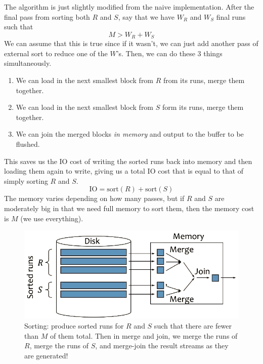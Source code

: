     \begin{algo} 
      The algorithm is just slightly modified from the naive implementation. After the final pass from sorting both $R$ and $S$, say that we have $W_R$ and $W_S$ final runs such that 
      \begin{equation}
        M > W_R + W_S
      \end{equation} 
      We can assume that this is true since if it wasn't, we can just add another pass of external sort to reduce one of the $W$'s. Then, we can do these 3 things simultaneously. 
      \begin{enumerate}
        \item We can load in the next smallest block from $R$ from its runs, merge them together.
        \item We can load in the next smallest block from $S$ form its runs, merge them together. 
        \item We can join the merged blocks \textit{in memory} and output to the buffer to be flushed. 
      \end{enumerate}

      This saves us the IO cost of writing the sorted runs back into memory and then loading them again to write, giving us a total IO cost that is equal to that of simply sorting $R$ and $S$. 
      \begin{equation}
        \mathrm{IO} = \mathrm{sort}(R) + \mathrm{sort}(S)
      \end{equation} 
      The memory varies depending on how many passes, but if $R$ and $S$ are moderately big in that we need full memory to sort them, then the memory cost is $M$ (we use everything). 

      \begin{figure}[H]
        \centering 
        \includegraphics[scale=0.4]{img/smj_optim.png}
        \caption{Sorting: produce sorted runs for $R$ and $S$ such that there are fewer than $M$ of them total. Then in merge and join, we merge the runs of $R$, merge the runs of $S$, and merge-join the result streams as they are generated!} 
        \label{fig:smj_optim}
      \end{figure}
    \end{algo}

